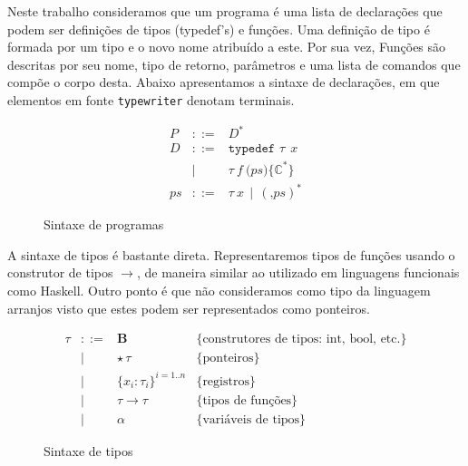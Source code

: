 \documentclass[a4paper,8pt]{article}
\begin{document}
     Neste trabalho consideramos que um programa é uma lista de
     declarações que podem ser definições de tipos (typedef's) e
     funções. Uma definição de tipo é formada por um tipo e o novo 
     nome atribuído a este. Por sua vez, Funções são descritas por seu 
     nome, tipo de retorno, parâmetros e uma lista de comandos que 
     compõe o corpo desta. Abaixo apresentamos a sintaxe de
     declarações, em que elementos em fonte \texttt{typewriter}
     denotam terminais.
     
     \begin{figure}[h]
         \[
               \begin{array}{lcl}
                   P & ::=    & D^*\\
                   D & ::=   & \texttt{typedef }\tau\:\:x\\
                      & \mid & \tau\:f\:\texttt{(}ps\texttt{)} \texttt{\{}\mathbb{C}^*\texttt{\}} \\
                   ps & ::= & \tau\:x \,\mid\,(\texttt{,}ps)^*
               \end{array}
         \]
         \centering
         \caption{Sintaxe de programas}
         \label{figprogsyn}
     \end{figure}

     A sintaxe de tipos é bastante direta. Representaremos tipos de
     funções usando o construtor de tipos $\to$, de maneira similar ao
     utilizado em linguagens funcionais como Haskell. 
     Outro ponto é que não consideramos
     como tipo da linguagem arranjos visto que estes podem ser
     representados como ponteiros.

     \begin{figure}[h]
       \[
         \begin{array}{lcll}
           \tau & ::= & \textbf{B} & \{\text{construtores de tipos:
                                     int, bool, etc.}\}\\
                & \mid & \star\, \tau & \{\text{ponteiros}\} \\
                & \mid & \{x_i : \tau_i\}^{i=1..n} & \{\text{registros}\} \\
                & \mid & \tau \to \tau & \{\text{tipos de
                                           funções}\}\\
               & \mid & \alpha & \{\text{variáveis de tipos}\}
         \end{array}
       \]
       \centering
       \caption{Sintaxe de tipos}
       \label{figtypesyn}
     \end{figure}
\end{document}
